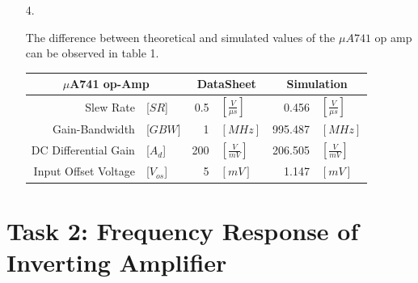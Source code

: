 \documentclass[11pt,a4paper]{article}
\begin{document}
\begin{enumerate}
    
 \item[4.]
 

The difference between theoretical and simulated values of the $\mu A741$ op amp can be observed in table 1.\\

\begin{minipage}{\linewidth}

\begin{center}
  \begin{tabular}{r l r l r l}
	\multicolumn{2}{c}{$\mu$A741 op-Amp} &   
  \multicolumn{2}{c}{DataSheet} &
  \multicolumn{2}{c}{Simulation}\\
  \hline
  \vspace{0.2em}
  Slew Rate & [$SR$] & 0.5 & $ [\frac{V}{\mu s}]$ & 0.456& $      [\frac{V}{\mu s}]$ \\
  	\vspace{0.2em}
  Gain-Bandwidth & [$GBW$]& 1 &$ [MHz]$  & 995.487 &$ [MHz]$ \\
  	\vspace{0.2em}
  DC Differential Gain &[$A_{d}$] & 200& $[\frac{V}{mV}]$ & 206.505& $[\frac{V}{mV}]$ \\
  	\vspace{0.2em}
  Input Offset Voltage &[$V_{os}$] & 5& $[mV]$& 1.147& $[mV]$ \\
    \end{tabular}
\end{center}
\end{minipage}
\end{enumerate}

\section*{Task 2: Frequency Response of Inverting Amplifier}
\end{document}
